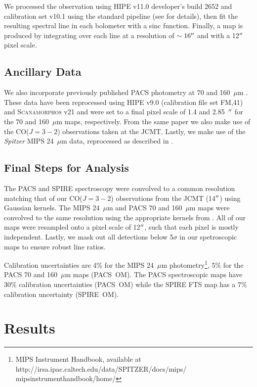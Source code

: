 We processed the observation using HIPE v11.0 developer's build 2652 and calibration set v10.1 using the standard pipeline (see \citet{parkin_2013} for details), then fit the resulting spectral line in each bolometer with a sinc function.  Finally, a map is produced by integrating over each line at a resolution of $\sim 16\mbox{$^{\prime\prime}$}$ and with a 12$\mbox{$^{\prime\prime}$}$ pixel scale.

\subsection{Ancillary Data}
We also incorporate previously published PACS photometry at 70 and 160~$\mu$m \citep{2012MNRAS.422.2291P}.  These data have been reprocessed using HIPE v9.0 (calibration file set FM,41) and \textsc{Scanamorphos} v21 and were set to a final pixel scale of 1.4 and 2.85~$\mbox{$^{\prime\prime}$}$ for the 70 and 160~$\mu$m maps, respectively.  From the same paper we also make use of the CO($J=3-2$) observations taken at the JCMT.  Lastly, we make use of the \emph{Spitzer} MIPS 24~$\mu$m data, reprocessed as described in \citep{2012MNRAS.423..197B}.

\subsection{Final Steps for Analysis}\label{prep_analysis}
The PACS and SPIRE spectroscopy were convolved to a common resolution matching that of our CO($J = 3-2$) observations from the JCMT (14$\mbox{$^{\prime\prime}$}$) using Gaussian kernels.  The MIPS 24~$\mu$m and PACS 70 and 160~$\mu$m maps were convolved to the same resolution using the appropriate kernels from \citet{2011PASP..123.1218A}.  All of our maps were resampled onto a pixel scale of 12$\mbox{$^{\prime\prime}$}$, such that each pixel is mostly independent.  Lastly, we mask out all detections below 5$\sigma$ in our spetroscopic maps to ensure robust line ratios.

Calibration uncertainties are 4\% for the MIPS 24~$\mu$m photometry\footnote{MIPS Instrument Handbook, available at http://irsa.ipac.caltech.edu/data/SPITZER/docs/mips/\\mipsinstrumenthandbook/home/}, 5\% for the PACS 70 and 160~$\mu$m maps (PACS~OM).  The PACS spectroscopic maps have 30\% calibration uncertainties (PACS~OM) while the SPIRE FTS map has a 7\% calibration uncertainty (SPIRE~OM).

\section{Results}\label{results}


